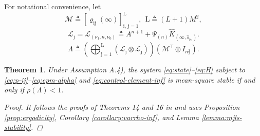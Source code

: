 \documentclass[journal,twoside,web]{ieeecolor}
\newtheorem{theorem}{Theorem}
\begin{document}
For notational convenience, let 
\begin{equation}\label{eq:mathcalM}
    \mathcal{M} \triangleq \left[ \varrho_{{\mathrm{i}\mathrm{j}}}(\infty)\right]_{\mathrm{i},\,\mathrm{j}=1}^{\mathrm{L}},~~
    \mathrm{L}\triangleq (L+1)M^2,
\end{equation}
\begin{equation}\label{eq:mathcalL}
    \mathcal{L}_{\mathrm{j}} = \mathcal{L}_{({\nu_1},n,{\nu_0})} \triangleq A^{n+1} + \mathit{\Psi}_{(n)} \hat{K}_{(\infty,\hat{s}_{\nu_0})}.
\end{equation}
\begin{equation}\label{eq:Lambda}
\mathit{\Lambda} \triangleq \left( \bigoplus\nolimits_{\mathrm{j}=1}^{\mathrm{L}} 
    \left( \mathcal{L}_{\mathrm{j}} \otimes \mathcal{L}_{\mathrm{j}} \right)\right)
    \left( \mathcal{M}^{\top} \otimes I_{n_x^2} \right). %
\end{equation}
\begin{theorem}\label{theorem:stability}
    Under Assumption A.4), the system \eqref{eq:state}--\eqref{eq:H} subject to \eqref{eq:p-ij}--\eqref{eq:epm-alpha} and \eqref{eq:control-element-inf} is mean-square stable if and only if $\rho\left(\mathit{\Lambda}\right)<1$.

    \begin{proof}
        It follows the proofs of Theorems 14 and 16 in \cite{yZL-2025-automatica} and uses Proposition \ref{prop:ergodicity}, Corollary \ref{corollary:varrho-inf}, and Lemma \ref{lemma:mjls-stability}.
    \end{proof}
\end{theorem}







\end{document}
